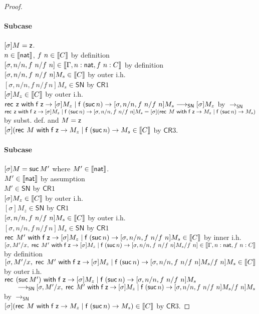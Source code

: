 \documentclass{article}
\newcommand{\SN}{\mathsf{SN}}
\newcommand{\CR}{\mathsf{CR}}
\newcommand{\redSN}{\longrightarrow_\SN}
\def\lv{\mathopen{{[\kern-0.14em[}}}    %
\def\rv{\mathclose{{]\kern-0.14em]}}}   %
\newcommand{\den}[1]{\lv #1 \rv}
\begin{document}
\begin{proof}
 \paragraph{Subcase } $[\sigma]M = \mathsf{z}$.
 \\
 $n \in \den{\nat}$, $f~n \in \den{C}$ \hfill by definition \\
 $[\sigma, n/n, f~n/f~n] \in \den{\Gamma, n:\nat, f~n:C}$ \hfill by definition \\
 $[\sigma, n/n, f~n/f~n]M_s \in \den{C}$ \hfill by outer i.h. \\
 $[\sigma, n/n, f~n/f~n]M_s \in \SN$ \hfill by $\CR1$ \\
 $[\sigma]M_z \in \den{C}$ \hfill by outer i.h. \\
 $\recnat \zero {[\sigma]M_z} {[\sigma, n/n,f~n/f~n]M_s} \redSN [\sigma]M_z$
 \hfill by $\redSN$ \\ 
$\mathsf{rec}^{}~\mathsf{z}~\mathsf{with}\;{\mathsf{f}}\;\mathsf{z} \rightarrow [\sigma]M_z \mid {\mathsf{f}}\;({\mathsf{suc}}\, n) \rightarrow {[\sigma, n/n,f~n/f~n]M_s} = [\sigma](\mathsf{rec}^{}~M~\mathsf{with}\;{\mathsf{f}}\;\mathsf{z} \rightarrow M_z \mid {\mathsf{f}}\;({\mathsf{suc}}\, n) \rightarrow {M_s})$ \hfill by subst. def. and $M = \mathsf{z}$\\
 $[\sigma](\recnat{M} {M_z}{M_s} \in \den{C}$ \hfill by $\CR3$.

 \paragraph{Subcase } $[\sigma]M = {\mathsf{suc}}\, M'$ where $M' \in \den{\nat}$.
 \\
 $M' \in \den{\nat}$ \hfill by assumption \\
 $M' \in \SN$ \hfill by $\CR1$ \\
 $[\sigma]M_z \in \den{C}$ \hfill by outer i.h. \\
 $[\sigma]M_z \in \SN$ \hfill by $\CR1$ \\
 $[\sigma, n/n, f~n/f~n]M_s \in \den{C}$ \hfill by outer i.h. \\
$[\sigma, n/n, f~n/f~n]M_s \in \SN$ \hfill by $\CR1$ \\
 $\recnat{M'}{[\sigma]M_z}{[\sigma, n/n, f~n/f~n]M_s} \in \den{C}$ \hfill by inner i.h. \\
 $[\sigma, M'/x, \;\recnat{M'}{[\sigma]M_z}{[\sigma, n/n, f~n/f~n]M_s}/f~n] \in
 \den{\Gamma, n:\nat, f~n:C}$ \hfill by definition \\
 $[\sigma, M'/x, \;\recnat{M'}{[\sigma]M_z}{[\sigma, n/n, f~n/f~n]M_s}/f~n]M_s \in \den{C}$ \hfill by outer i.h. \\
 $\mathsf{rec}^{}~({\mathsf{suc}}\, M')~\mathsf{with}\;{\mathsf{f}}\;\mathsf{z} \rightarrow [\sigma]M_z \mid {\mathsf{f}}\;({\mathsf{suc}}\, n) \rightarrow {[\sigma, n/n, f~n/f~n]M_s} $ \\
 $\qquad \redSN
 [\sigma, M'/x, \;\recnat{M'}{[\sigma]M_z}{[\sigma, n/n, f~n/f~n]M_s}/f~n]M_s$
 \hfill by $\redSN$ \\
 $[\sigma](\recnat{M}{M_z}{M_s}) \in \den{C}$ \hfill by $\CR3$.


\end{proof}
\end{document}
